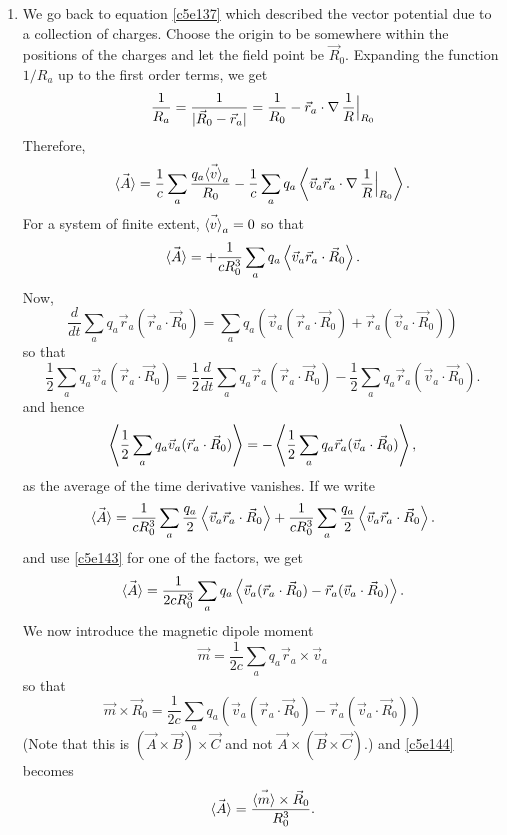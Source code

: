 \begin{enumerate}
\item We go back to equation \eqref{c5e137} which described the vector potential
due to a collection of charges. Choose the origin to be somewhere within the
positions of the charges and let the field point be $\vec{R}_0$. Expanding the
function $1/R_a$ up to the first order terms, we get
\[
\frac{1}{R_a} = \frac{1}{|\vec{R}_0 - \vec{r}_a|} = 
\frac{1}{R_0} - \vec{r}_a\cdot\operatorname{\nabla}\frac{1}{R}\Big|_{R_0}
\]
Therefore,
\begin{equation}\label{c5e141}
\vec{\left\langle{A}\right\rangle} = \frac{1}{c}\sum_a\frac{q_a\vec{\left\langle{v}\right\rangle}_a}{R_0} - 
\frac{1}{c}\sum_aq_a\left\langle{\vec{v}_a\vec{r}_a\cdot\operatorname{\nabla}\frac{1}{R}\Big|_{R_0}}\right\rangle.
\end{equation}
For a system of finite extent, $\vec{\left\langle{v}\right\rangle}_a = 0$ so that
\begin{equation}\label{c5e142}
\vec{\left\langle{A}\right\rangle} = +\frac{1}{cR_0^3}\sum_aq_a\left\langle{\vec{v}_a\vec{r}_a\cdot\vec{R}_0}\right\rangle.
\end{equation}
Now,
\[
\frac{d}{dt}\sum_a q_a\vec{r}_a(\vec{r}_a\cdot\vec{R}_0) = 
\sum_a q_a\left(\vec{v}_a(\vec{r}_a\cdot\vec{R}_0) + 
\vec{r}_a(\vec{v}_a\cdot\vec{R}_0)\right)
\]
so that
\[
\frac{1}{2}\sum_a q_a \vec{v}_a(\vec{r}_a\cdot\vec{R}_0) = 
\frac{1}{2}\frac{d}{dt}\sum_a q_a\vec{r}_a(\vec{r}_a\cdot\vec{R}_0) - 
\frac{1}{2}\sum_a q_a \vec{r}_a(\vec{v}_a\cdot\vec{R}_0).
\]
and hence
\begin{equation}\label{c5e143}
\left\langle{\frac{1}{2}\sum_a q_a \vec{v}_a(\vec{r}_a\cdot\vec{R}_0)}\right\rangle = 
-\left\langle{\frac{1}{2}\sum_a q_a \vec{r}_a(\vec{v}_a\cdot\vec{R}_0)}\right\rangle,
\end{equation}
as the average of the time derivative vanishes. If we write
\[
\vec{\left\langle{A}\right\rangle} = \frac{1}{cR_0^3}
\sum_a\frac{q_a}{2}\left\langle{\vec{v}_a\vec{r}_a\cdot\vec{R}_0}\right\rangle
 + \frac{1}{cR_0^3}\sum_a\frac{q_a}{2}\left\langle{\vec{v}_a\vec{r}_a\cdot\vec{R}_0}\right\rangle.
\]
and use \eqref{c5e143} for one of the factors, we get
\begin{equation}\label{c5e144}
\vec{\left\langle{A}\right\rangle} = \frac{1}{2cR_0^3}\sum_aq_a\left\langle{\vec{v}_a(\vec{r}_a\cdot\vec{R}_0) - 
\vec{r}_a(\vec{v}_a\cdot\vec{R}_0)}\right\rangle.
\end{equation}
We now introduce the magnetic dipole moment
\begin{equation}\label{c5e145}
\vec{m} = \frac{1}{2c}\sum_a q_a\vec{r}_a \times \vec{v}_a
\end{equation}
so that
\[
\vec{m} \times \vec{R}_0 = \frac{1}{2c}
\sum_a q_a(\vec{v}_a(\vec{r}_a\cdot\vec{R}_0) - 
\vec{r}_a(\vec{v}_a\cdot\vec{R}_0))
\]
(Note that this is $(\vec{A} \times \vec{B})\times\vec{C}$ and not $\vec{A}
\times (\vec{B}\times\vec{C})$.) and \eqref{c5e144} becomes
\begin{equation}\label{c5e146}
\vec{\left\langle{A}\right\rangle} = \frac{\vec{\left\langle{m}\right\rangle} \times \vec{R}_0}{R_0^3}.
\end{equation}


\end{enumerate}
